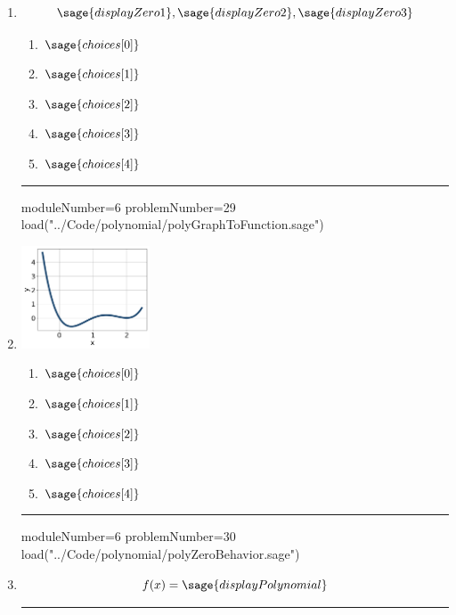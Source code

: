 \documentclass[14pt]{article}
\newcommand{\litem}[1]{\item#1\hspace*{-1cm}\rule{\textwidth}{0.4pt}}
\begin{document}
\begin{enumerate}
\litem{ 

	\[ \sage{displayZero1}, \sage{displayZero2}, \sage{displayZero3} \]

	\begin{enumerate}[label=\Alph*.]
		\item \( \sage{choices[0]} \)
		\item \( \sage{choices[1]} \)
		\item \( \sage{choices[2]} \)
		\item \( \sage{choices[3]} \)
		\item \( \sage{choices[4]} \)
	\end{enumerate}
}

\begin{sagesilent}
moduleNumber=6
problemNumber=29
load("../Code/polynomial/polyGraphToFunction.sage")
\end{sagesilent}

\litem{ 

	\begin{center}
	\includegraphics[width = 0.3\textwidth]{../Figures/polyGraphToFunctionA.png}
	\end{center}

	\begin{enumerate}[label=\Alph*.]
		\item \( \sage{choices[0]} \)
		\item \( \sage{choices[1]} \)
		\item \( \sage{choices[2]} \)
		\item \( \sage{choices[3]} \)
		\item \( \sage{choices[4]} \)
	\end{enumerate}
}

\begin{sagesilent}
moduleNumber=6
problemNumber=30
load("../Code/polynomial/polyZeroBehavior.sage")
\end{sagesilent}

\litem{ 

	\[ f(x) = \sage{displayPolynomial} \]

}
\end{enumerate}
\end{document}
